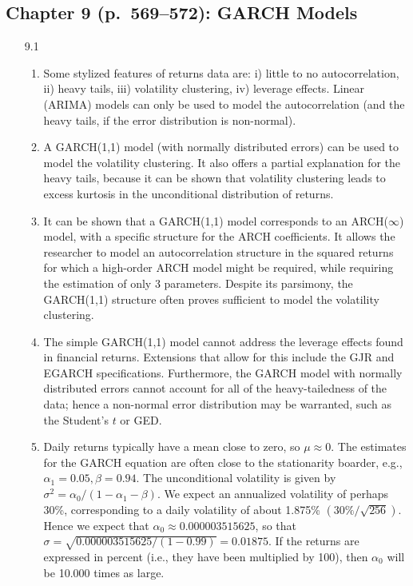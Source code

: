 \documentclass[11pt,a4paper]{article}
\begin{document}
\subsection*{Chapter 9 (p.\ 569--572): GARCH Models}
\begin{enumerate}
\item[9.1]
\begin{enumerate}
\item Some stylized features of returns data are: i) little to no autocorrelation, ii) heavy tails, iii) volatility clustering, iv) leverage effects. Linear (ARIMA) models can only be used to model the autocorrelation (and the heavy tails, if the error distribution is non-normal).
\item A GARCH(1,1) model (with normally distributed errors) can be used to model the volatility clustering. It also offers a partial explanation for the heavy tails, because it can be shown that volatility clustering leads to excess kurtosis in the unconditional distribution of returns.
\item It can be shown that a GARCH(1,1) model corresponds to an ARCH($\infty$) model, with a specific structure for the ARCH coefficients. It allows the researcher to model an autocorrelation structure in the squared returns for which a high-order ARCH model might be required, while requiring the estimation of only 3 parameters. Despite its parsimony, the GARCH(1,1) structure often proves sufficient to model the volatility clustering.
\item The simple GARCH(1,1) model cannot address the leverage effects found in financial returns. Extensions that allow for this include the GJR and EGARCH specifications. Furthermore, the GARCH model with normally distributed errors cannot account for all of the heavy-tailedness of the data; hence a non-normal error distribution may be warranted, such as the Student's $t$ or GED.
\item Daily returns typically have a mean close to zero, so $\mu\approx 0$. The estimates for the GARCH equation are often close to the stationarity boarder, e.g., $\alpha_1=0.05, \beta=0.94$. The unconditional volatility is given by $\sigma^2=\alpha_0/(1-\alpha_1-\beta)$. We expect an annualized volatility of perhaps 30\%, corresponding to a daily volatility of about 1.875\% $(30\%/\sqrt{256})$. Hence we expect that $\alpha_0\approx 0.000003515625$, so that $\sigma=\sqrt{0.000003515625/(1-0.99)}=0.01875$. If the returns are expressed in percent (i.e., they have been multiplied by 100), then $\alpha_0$ will be 10.000 times as large.

\end{enumerate}
\end{enumerate}
\end{document}
